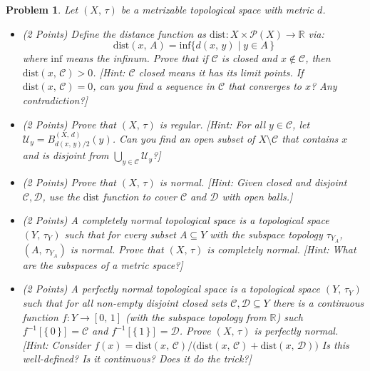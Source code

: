 \documentclass{article}
\theoremstyle{normal}
\newtheorem{problem}{Problem}
\begin{document}
    \begin{problem}
        Let $(X,\,\tau)$ be a metrizable topological space with metric $d$.
        \begin{itemize}
            \item (2 Points)
                Define the distance function as
                $\textrm{dist}:X\times\mathcal{P}(X)\rightarrow\mathbb{R}$ via:
                \begin{equation}
                    \textrm{dist}(x,\,A)=
                    \textrm{inf}\big\{d(x,\,y)\;|\;y\in{A}\,\big\}
                \end{equation}
                where $\textrm{inf}$ means the \textit{infinum}. Prove that if
                $\mathcal{C}$ is closed and $x\notin\mathcal{C}$, then
                $\textrm{dist}(x,\,\mathcal{C})>0$. [Hint: $\mathcal{C}$ closed
                means it has its limit points. If
                $\textrm{dist}(x,\,\mathcal{C})=0$, can you find a sequence
                in $\mathcal{C}$ that converges to $x$? Any contradiction?]
            \item (2 Points) Prove that $(X,\,\tau)$ is regular.
                [Hint: For all $y\in\mathcal{C}$, let
                $\mathcal{U}_{y}=B_{d(x,\,y)/2}^{(X,\,d)}(y)$. Can you find
                an open subset of $X\setminus\mathcal{C}$ that contains
                $x$ and is disjoint from
                $\bigcup_{y\in\mathcal{C}}\mathcal{U}_{y}$?]
            \item (2 Points)
                Prove that $(X,\,\tau)$ is normal. [Hint: Given closed and
                disjoint $\mathcal{C},\mathcal{D}$, use the $\textrm{dist}$
                function to cover $\mathcal{C}$ and $\mathcal{D}$ with open
                balls.]
            \item (2 Points)
                A completely normal topological space is a topological space
                $(Y,\,\tau_{Y})$ such that for every subset $A\subseteq{Y}$ with
                the subspace topology $\tau_{Y_{A}}$, $(A,\,\tau_{Y_{A}})$ is
                normal. Prove that $(X,\,\tau)$ is completely normal.
                [Hint: What are the subspaces of a metric space?]
            \item (2 Points)
                A perfectly normal topological space is a topological space
                $(Y,\,\tau_{Y})$ such that for all non-empty disjoint closed
                sets $\mathcal{C},\mathcal{D}\subseteq{Y}$ there is a continuous
                function $f:Y\rightarrow[0,\,1]$ (with the subspace topology
                from $\mathbb{R}$) such $f^{-1}[\{\,0\,\}]=\mathcal{C}$ and
                $f^{-1}[\{\,1\,\}]=\mathcal{D}$. Prove $(X,\,\tau)$ is
                perfectly normal. [Hint: Consider
                $f(x)=\textrm{dist}(x,\,\mathcal{C})/\big(\textrm{dist}(x,\,\mathcal{C})+\textrm{dist}(x,\,\mathcal{D})\big)$
                Is this well-defined? Is it continuous? Does it do the trick?]
        \end{itemize}
    \end{problem}
\end{document}
